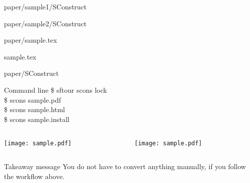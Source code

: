 \begin{frame}
  \begin{block}{paper/sample1/SConstruct}
  
  \end{block}
  \begin{block}{paper/sample2/SConstruct}
  
  \end{block}
\end{frame}

\begin{frame}
  \begin{block}{paper/sample.tex}
  
                   {sample.tex}
  \end{block}
\end{frame}

\begin{frame}
  \begin{block}{paper/SConstruct}
  
  \vspace{3mm}
  
  \end{block}
  \begin{block}{Command line}
    \$ sftour scons lock \\
    \$ scons sample.pdf \\
    \$ scons sample.html \\
    \$ scons sample.install
  \end{block}
\end{frame}

\begin{frame}
  \begin{columns}
    \begin{column}{5.5cm}
      \begin{block}{}
      \texttt{[image: sample.pdf]}
      \end{block}
    \end{column}
    \begin{column}{5.5cm}
      \begin{block}{}
      \texttt{[image: sample.pdf]}
      \end{block}
    \end{column}
  \end{columns}
\end{frame}

\begin{frame}
  \begin{block}{Takeaway message}
    You do not have to convert anything manually, if you follow the workflow above.
  \end{block}
\end{frame}

